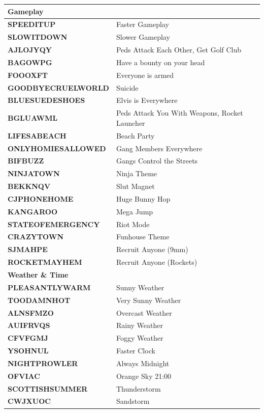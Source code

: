 \documentclass{article}
\begin{document}
\begin{small}
\begin{longtable}{|l l|}
	\hline
	\hline
	\textbf{Gameplay}& \\
	\hline
	\textbf{SPEEDITUP }& Faster Gameplay \\
	\textbf{SLOWITDOWN }& Slower Gameplay \\
	\textbf{AJLOJYQY }& Peds Attack Each Other, Get Golf Club \\
	\textbf{BAGOWPG }& Have a bounty on your head \\
	\textbf{FOOOXFT }& Everyone is armed \\
	\textbf{GOODBYECRUELWORLD }& Suicide \\
	\textbf{BLUESUEDESHOES }& Elvis is Everywhere \\
	\textbf{BGLUAWML }& Peds Attack You With Weapons, Rocket Launcher \\
	\textbf{LIFESABEACH}& Beach Party \\
	\textbf{ONLYHOMIESALLOWED }& Gang Members Everywhere \\
	\textbf{BIFBUZZ }& Gangs Control the Streets \\
	\textbf{NINJATOWN }& Ninja Theme \\
	\textbf{BEKKNQV }& Slut Magnet \\
	\textbf{CJPHONEHOME }& Huge Bunny Hop \\
	\textbf{KANGAROO }& Mega Jump \\
	\textbf{STATEOFEMERGENCY }& Riot Mode \\
	\textbf{CRAZYTOWN }& Funhouse Theme \\
	\textbf{SJMAHPE }& Recruit Anyone (9mm) \\
	\textbf{ROCKETMAYHEM }& Recruit Anyone (Rockets) \\
	\hline
	\hline
	\textbf{Weather \& Time}& \\
	\hline
	\textbf{PLEASANTLYWARM }& Sunny Weather \\
	\textbf{TOODAMNHOT }& Very Sunny Weather \\
	\textbf{ALNSFMZO }& Overcast Weather \\
	\textbf{AUIFRVQS }& Rainy Weather \\
	\textbf{CFVFGMJ }& Foggy Weather \\
	\textbf{YSOHNUL }& Faster Clock \\
	\textbf{NIGHTPROWLER }& Always Midnight \\
	\textbf{OFVIAC }& Orange Sky 21:00 \\
	\textbf{SCOTTISHSUMMER }& Thunderstorm \\
	\textbf{CWJXUOC }& Sandstorm \\
	\hline
\end{longtable}
\end{small}
\end{document}
